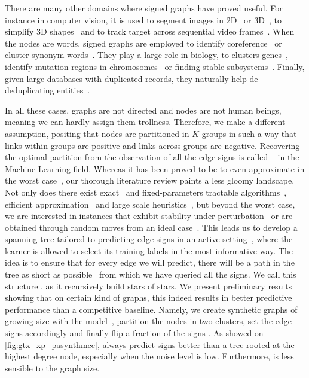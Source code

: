 There are many other domains where signed graphs have proved useful. For instance in computer
vision, it is used to segment images in 2D~\autocites{Kim2011}{Bagon2011}{CellSeg14} or
3D~\autocites{VolumeSegmentation12}{Beier2015}, to simplify 3D shapes~\autocite{Shape3D17} and to
track target across sequential video frames~\autocite{multiTracking15}. When the nodes are words,
signed graphs are employed to identify coreference~\autocites{graphicalCoreference04}{Elsner2009} or
cluster synonym words~\autocite{SignedWordRatings}. They play a large role in biology, to clusters
genes~\autocite{Ben-Dor99}, identify mutation regions in chromosomes~\autocite{Das2015} or finding
stable subsystems~\autocite{monotoneBiology07}. Finally, given large databases with duplicated
records, they naturally help de-deduplicating
entities~\autocites{Crosslingual07}{DeDup09}{LargeScaleDeDup09}{WeightedER14}.

In all these cases, graphs are not directed and nodes are not human beings, meaning we can hardly
assign them trollness.  Therefore, we make a different assumption, positing that nodes are
partitioned in $K$ groups in such a way that links within groups are positive and links across
groups are negative. Recovering the optimal partition from the observation of all the edge signs is
called \pcc{}~\autocite{Bansal2002} in the Machine Learning field. Whereas it has been proved to be
\NPc{} to even approximate in the worst case~\autocites{Charikar2003}{Demaine2006}, our thorough
literature review paints a less gloomy landscape. Not only does there exist
exact~\autocite{Berg2015} and fixed-parameters tractable algorithms~\autocites{GoldenCE12}{Fomin2014},
efficient approximation~\autocites{CCPivotConf05}{ChawlaArxiv14} and large scale
heuristics~\autocites{Levorato2015}{Facchetti2011isingmodel}{Kappes2016}, but beyond the worst case,
we are interested in instances that exhibit stability under
perturbation~\autocites{clusteringFeasibility15}{StableCC09}{StableLP09} or are obtained through
random moves from an ideal case~\autocites{plantedAilon09}{Makarychev2014}. This leads us to develop
a spanning tree tailored to predicting edge signs in an active setting~\autocite{Cesa-Bianchi2012b},
where the learner is allowed to select its training labels in the most informative way. The idea is
to ensure that for every edge we will predict, there will be a path in the tree as short as
possible~\autocites{LowerBound95}{Abraham2012} from which we have queried all the signs. We call
this structure \gtx{}, as it recursively build stars of stars. 
We present preliminary results showing that on certain
kind of graphs, this indeed results in better predictive performance than a competitive baseline.
Namely, we create synthetic graphs of growing size with the \lpa{} model~\autocite{Barabasi1999},
partition the nodes in two clusters, set the edge signs accordingly and finally flip a fraction of
the signs \uar{}. As showed on \autoref{fig:gtx_xp_pasynthmcc}, \gtx{} always predict signs better than a
\bfs{} tree rooted at the highest degree node, especially when the noise level is low. Furthermore,
\gtx{} is less sensible to the graph size.

